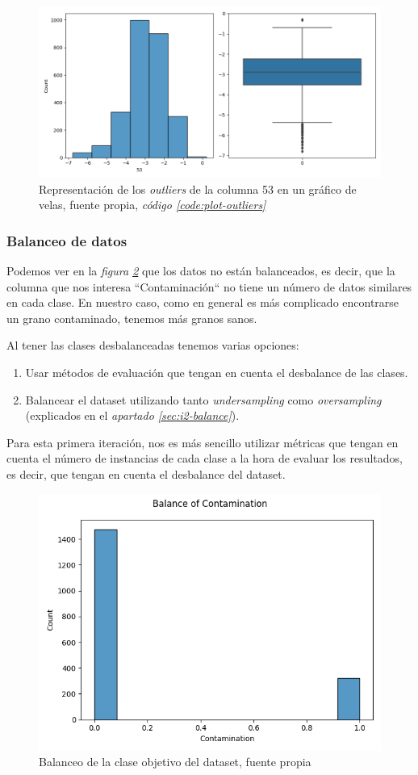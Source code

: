 \begin{figure}[!htb]
    \centering
    \includegraphics[width=0.7\linewidth]{media/images/col-53-outliers.png}
    \caption{Representación de los \textit{outliers} de la columna 53 en un gráfico de velas, fuente propia, \textit{código \ref{code:plot-outliers}}}
    \label{fig:outliers}
\end{figure}


\subsubsection{Balanceo de datos}

Podemos ver en la \textit{figura \ref{fig:unbalance}} que los datos no están balanceados, es decir, que la columna que nos interesa ``Contaminación`` no tiene un número de datos similares en cada clase. En nuestro caso, como en general es más complicado encontrarse un grano contaminado, tenemos más granos sanos.

Al tener las clases desbalanceadas tenemos varias opciones:
\begin{enumerate}
    \item Usar métodos de evaluación que tengan en cuenta el desbalance de las clases.
    \item Balancear el \gls{dataset} utilizando tanto \textit{undersampling} como \textit{oversampling} (explicados en el \textit{apartado \ref{sec:i2-balance}}).
\end{enumerate}

Para esta primera iteración, nos es más sencillo utilizar métricas que tengan en cuenta el número de instancias de cada clase a la hora de evaluar los resultados, es decir, que tengan en cuenta el desbalance del \gls{dataset}.

\begin{figure}[!ht]
    \centering
    \includegraphics[width=0.7\linewidth]{media/images/unabalance.png}
    \caption{Balanceo de la clase objetivo del \gls{dataset}, fuente propia}
    \label{fig:unbalance}
\end{figure}


